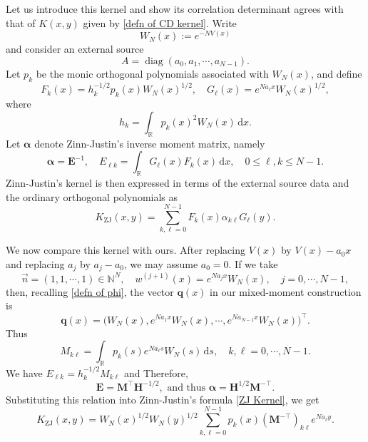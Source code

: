 \documentclass[a4paper,10pt,leqno]{amsart}
\numberwithin{equation}{section}
\theoremstyle{remark}
\newcommand{\dd}{\mathrm{d}}
\begin{document}
Let us introduce this kernel and show its correlation determinant agrees with that of $K(x,y)$ given by \eqref{defn of CD kernel}.   Write
\[ W_N(x):=e^{-N V(x)} \]
and consider an external source
\[  A=\operatorname{diag}(a_0,a_1,\cdots,a_{N-1}). \]
Let $p_k$ be the monic orthogonal polynomials associated with
$W_N(x)$, and define
\begin{equation}\label{ZJ FG}
    F_k(x)=h_k^{-1/2}p_k(x)W_N(x)^{1/2},
    \quad
    G_\ell(x)=e^{N a_\ell x}W_N(x)^{1/2},
\end{equation}
where
\[h_k=\int_{\mathbb R}p_k(x)^2W_N(x)\,\dd x.\]
Let $\boldsymbol\alpha$ denote Zinn-Justin's inverse moment matrix, namely
\begin{equation}\label{ZJ al}
    \boldsymbol\alpha
    =
    \boldsymbol E^{-1},
    \quad
    E_{\ell k}
    =
    \int_{\mathbb R}G_\ell(x)F_k(x)\,\dd x,
    \quad 0\leq \ell,k\leq N-1 .
\end{equation}
Zinn-Justin's kernel is then expressed in terms of the external source data
and the ordinary orthogonal polynomials as
\begin{equation}\label{ZJ Kernel}
    K_{\mathrm{ZJ}}(x,y)
    =
    \sum_{k,\ell=0}^{N-1}
        F_k(x)\alpha_{k\ell}G_\ell(y).
\end{equation}

We now compare this kernel with ours.  After replacing $V(x)$ by
$V(x)-a_0x$ and replacing $a_j$ by $a_j-a_0$, we may assume $a_0=0$.
If we take \begin{equation}\label{ZJ weights}
    \vec n=(1,1,\cdots,1)\in\mathbb N^N,  \quad
    w^{(j+1)}(x)=e^{N a_jx}W_N(x),
    \quad j=0,\cdots,N-1,
\end{equation}
then, recalling \eqref{defn of phi}, the vector $\boldsymbol{q}(x)$ in our
mixed-moment construction is
\[
    \boldsymbol{q}(x)=
    \bigl(
        W_N(x),
        e^{N a_1x}W_N(x),
        \cdots,
        e^{N a_{N-1}x}W_N(x)
    \bigr)^{\top}.
\]
Thus
\[  M_{k\ell}
    =
    \int_{\mathbb R}p_k(s)e^{N a_\ell s}W_N(s)\,\dd s,
    \quad k,\ell=0,\cdots,N-1.
\]
  We have $ E_{\ell k} = h_k^{-1/2}M_{k\ell}$ and  Therefore, 
\[
    \boldsymbol{E}
    =\boldsymbol{M}^{\top}\boldsymbol{H}^{-1/2},
\mbox{ \ and thus \ }
    \boldsymbol\alpha
    =
\boldsymbol{H}^{1/2}\boldsymbol{M}^{-\top}.
\]
Substituting this relation into Zinn-Justin's formula \eqref{ZJ Kernel}, we get
\begin{equation}
    \label{KZ}
    K_{\mathrm{ZJ}}(x,y)
=W_N(x)^{1/2}W_N(y)^{1/2}
    \sum_{k,\ell=0}^{N-1}
        p_k(x)
        \left(\boldsymbol{M}^{-\top}\right)_{k\ell}
        e^{N a_\ell y}.
\end{equation}  
\end{document}
